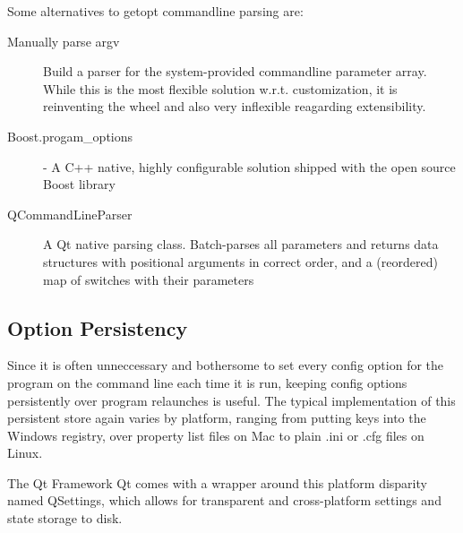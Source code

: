 Some alternatives to getopt commandline parsing are:
\begin{description}
\item [Manually parse argv] Build a parser for the system-provided commandline parameter array. While this is the most flexible solution w.r.t. customization, it is reinventing the wheel and also very inflexible reagarding extensibility.
\item [Boost.progam\_options] - A C++ native, highly configurable solution shipped with the open source Boost library
\item [QCommandLineParser] A Qt native parsing class. Batch-parses all parameters and returns data structures with positional arguments in correct order, and a (reordered) map of switches with their parameters
\end{description}



\subsection{Option Persistency}
Since it is often unneccessary and bothersome to set every config option for the program on the command line each time it is run, keeping config options persistently over program relaunches is useful. The typical implementation of this persistent store again varies by platform, ranging from putting keys into the Windows registry, over property list files on Mac to plain .ini or .cfg files on Linux.

The Qt Framework Qt comes with a wrapper around this platform disparity named QSettings, which allows for transparent and cross-platform settings and state storage to disk.

